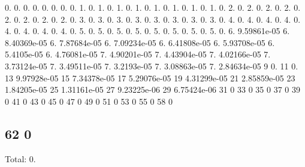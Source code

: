 0. 0. 0. 0. 0. 0. 0. 0. 1. 0. 1. 0. 1. 0. 1. 0. 1. 0. 1. 0. 1. 0. 1. 0. 2. 0. 2. 0. 2. 0. 2. 0. 2. 0. 2. 0. 2. 0. 2. 0. 3. 0. 3. 0. 3. 0. 3. 0. 3. 0. 3. 0. 3. 0. 3. 0. 4. 0. 4. 0. 4. 0. 4. 0. 4. 0. 4. 0. 4. 0. 4. 0. 5. 0. 5. 0. 5. 0. 5. 0. 5. 0. 5. 0. 5. 0. 5. 0. 6. 9.\+59861e-\/05 6. 8.\+40369e-\/05 6. 7.\+87684e-\/05 6. 7.\+09234e-\/05 6. 6.\+41808e-\/05 6. 5.\+93708e-\/05 6. 5.\+4105e-\/05 6. 4.\+76081e-\/05 7. 4.\+90201e-\/05 7. 4.\+43904e-\/05 7. 4.\+02166e-\/05 7. 3.\+73124e-\/05 7. 3.\+49511e-\/05 7. 3.\+2193e-\/05 7. 3.\+08863e-\/05 7. 2.\+84634e-\/05 9 0. 11 0. 13 9.\+97928e-\/05 15 7.\+34378e-\/05 17 5.\+29076e-\/05 19 4.\+31299e-\/05 21 2.\+85859e-\/05 23 1.\+84205e-\/05 25 1.\+31161e-\/05 27 9.\+23225e-\/06 29 6.\+75424e-\/06 31 0 33 0 35 0 37 0 39 0 41 0 43 0 45 0 47 0 49 0 51 0 53 0 55 0 58 0 \subsection*{62 0 }

Total\+: 0. 